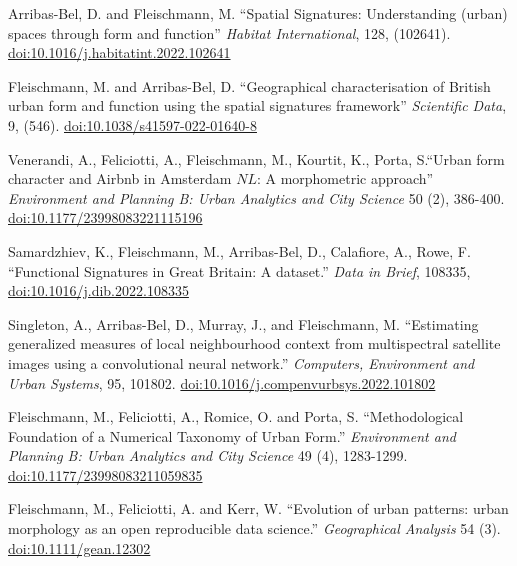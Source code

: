 \documentclass[12pt,a4paper]{report}
\begin{document}
\begin{tablist}
        \item[2022] \tab{}Arribas-Bel, D. and Fleischmann, M. \enquote{Spatial Signatures: Understanding (urban) spaces through form and function} \textit{Habitat International}, 128, (102641). \href{https://doi.org/10.1016/j.habitatint.2022.102641}{doi:10.1016/j.habitatint.2022.102641}

        \item[2022] \tab{}Fleischmann, M. and Arribas-Bel, D. \enquote{Geographical characterisation of British urban form and function using the spatial signatures framework} \textit{Scientific Data}, 9, (546). \href{https://doi.org/10.1038/s41597-022-01640-8}{doi:10.1038/s41597-022-01640-8}

        \item[2022] \tab{}Venerandi, A., Feliciotti, A., Fleischmann, M., Kourtit, K., Porta, S.\enquote{Urban form character and Airbnb in Amsterdam \(NL\): A morphometric approach} \textit{Environment and Planning B: Urban Analytics and City Science} 50 (2), 386-400. \href{https://doi.org/10.1177/23998083221115196}{doi:10.1177/23998083221115196}

        \item[2022] \tab{}Samardzhiev, K., Fleischmann, M., Arribas-Bel, D., Calafiore, A., Rowe, F. \enquote{Functional Signatures in Great Britain: A dataset.} \textit{Data in Brief}, 108335, \href{https://doi.org/10.1016/j.dib.2022.108335}{doi:10.1016/j.dib.2022.108335}

        \item[2022] \tab{}Singleton, A., Arribas-Bel, D., Murray, J., and Fleischmann, M. \enquote{Estimating generalized measures of local neighbourhood context from multispectral satellite images using a convolutional neural network.} \textit{Computers, Environment and Urban Systems}, 95, 101802. \href{https://doi.org/10.1016/j.compenvurbsys.2022.101802}{doi:10.1016/j.compenvurbsys.2022.101802}

        \item[2021] \tab{}Fleischmann, M., Feliciotti, A., Romice, O. and Porta, S. \enquote{Methodological Foundation of a Numerical Taxonomy of Urban Form.} \textit{Environment and Planning B: Urban Analytics and City Science} 49 (4), 1283-1299. \href{https://doi.org/10.1177/23998083211059835}{doi:10.1177/23998083211059835}

        \item[2021] \tab{}Fleischmann, M., Feliciotti, A. and Kerr, W. \enquote{Evolution of urban patterns: urban morphology as an open reproducible data science.} \textit{Geographical Analysis} 54 (3). \href{https://doi.org/10.1111/gean.12302}{doi:10.1111/gean.12302}


\end{tablist}
\end{document}
